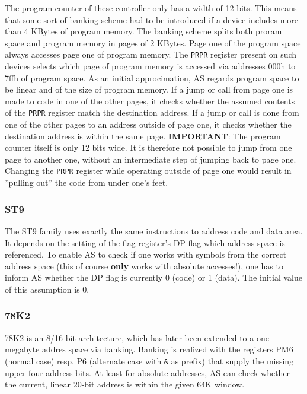 \documentclass[12pt,twoside]{report}
\newcommand{\bb}[1]{{\bf #1}}
\newcommand{\tty}[1]{{\tt #1}}
\begin{document}
The program counter of these controller only has a width of 12 bits.  This
means that some sort of banking scheme had to be introduced if a device
includes more than 4 KBytes of program memory.  The banking scheme splits
both proram space and program memory in pages of 2 KBytes.  Page one of the
program space always accesses page one of program memory.  The \tty{PRPR}
register present on such devices selects which page of program memory is
accessed via addresses 000h to 7ffh of program space.  As an initial
approcimation, AS regards program space to be linear and of the size of
program memory.  If a jump or call from page one is made to code in one
of the other pages, it checks whether the assumed contents of the \tty{PRPR}
register match the destination address.  If a jump or call is done from
one of the other pages to an address outside of page one, it checks whether
the destination address is within the same page.  {\bf IMPORTANT}: The
program counter itself is only 12 bits wide.  It is therefore not possible
to jump from one page to another one, without an intermediate step of
jumping back to page one.  Changing the \tty{PRPR} register while operating
outside of page one would result in ''pulling out'' the code from under
one's feet.


\subsubsection{ST9}

The ST9 family uses exactly the same instructions to address code and
data area.  It depends on the setting of the flag register's DP flag
which address space is referenced.  To enable AS to check if one
works with symbols from the correct address space (this of course
\bb{only} works with absolute accesses!), one has to inform AS whether the
DP flag is currently 0 (code) or 1 (data).  The initial value of this
assumption is 0.


\subsubsection{78K2}

78K2 is an 8/16 bit architecture, which has later been extended to a
one-megabyte addres space via banking.  Banking is realized with the
registers PM6 (normal case) resp. P6 (alternate case with \verb!&! as
prefix) that supply the missing upper four address bits.  At least for
absolute addresses, AS can check whether the current, linear 20-bit
address is within the given 64K window.
\end{document}
